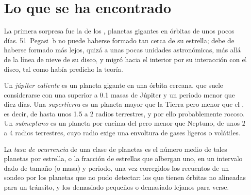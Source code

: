 
\section{Lo que se ha encontrado}\label{sec:b3:exoplanets:found}

La primera sorpresa fue la de los , planetas gigantes en órbitas de
unos pocos días. 51~Pegasi~b no puede haberse formado tan cerca de su estrella; debe de
haberse formado más lejos, quizá a unas pocas unidades astronómicas, más allá de la
línea de nieve de su disco, y migró hacia el interior por su interacción con
el disco, tal como había predicho la teoría.

\begin{definition}\label{def:b3:exoplanets:classes}
Un \emph{júpiter caliente} es un planeta gigante en una órbita cercana,
que suele considerarse con una  superior a 0.1 masas de Júpiter y un periodo
menor que diez días. Una \emph{supertierra} es un planeta
mayor que la Tierra pero menor que el , es decir, de hasta
unos 1.5 a 2 radios terrestres, y por ello probablemente rocoso. Un \emph{subneptuno}
es un planeta por encima del  pero menor que Neptuno, de unos 2 a
4 radios terrestres, cuyo radio exige una envoltura de gases ligeros o
volátiles.
\end{definition}

\begin{definition}\label{def:b3:exoplanets:occurrence}
La \emph{tasa de ocurrencia} de una clase de planetas es
el número medio de tales planetas por estrella, o la fracción de estrellas que
albergan uno, en un intervalo dado de tamaño (o masa) y periodo, una vez
corregidos los recuentos de un sondeo por los planetas que no pudo detectar:
los que tienen órbitas no alineadas para un tránsito, y los demasiado pequeños o
demasiado lejanos para verse.
\end{definition}

